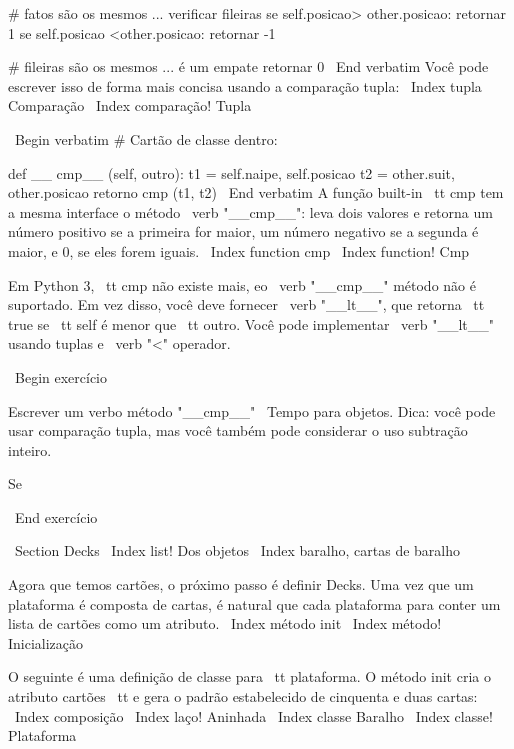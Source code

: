 \documentclass[10pt]{book}
\begin{document}
{{{{{{{{{{{{{{{{        # fatos são os mesmos ... verificar fileiras
        se self.posicao> other.posicao: retornar 1
        se self.posicao <other.posicao: retornar -1

        # fileiras são os mesmos ... é um empate
        retornar 0    
\ End {verbatim}
%
Você pode escrever isso de forma mais concisa usando a comparação tupla:
\ Index {tupla Comparação}
\ Index {comparação! Tupla}

\ Begin {verbatim}
# Cartão de classe dentro:

    def __ cmp__ (self, outro):
        t1 = self.naipe, self.posicao
        t2 = other.suit, other.posicao
        retorno cmp (t1, t2)
\ End {verbatim}
%
A função built-in {\ tt cmp} tem a mesma interface
o método \ verb "__cmp__": leva dois valores e retorna
um número positivo se a primeira for maior, um número negativo
se a segunda é maior, e 0, se eles forem iguais.
\ Index {function cmp}
\ Index {function! Cmp}

Em Python 3, {\ tt cmp} não existe mais, eo \ verb "__cmp__"
método não é suportado. Em vez disso, você deve fornecer \ verb "__lt__",
que retorna {\ tt true} se {\ tt self} é menor que {\ tt outro}.
Você pode implementar \ verb "__lt__" usando tuplas e \ verb "<"
operador.

\ Begin {} exercício

Escrever um verbo método "__cmp__" \ Tempo para objetos. Dica: você
pode usar comparação tupla, mas você também pode considerar o uso
subtração inteiro.


Se%

\ End {} exercício


\ Section {} Decks
\ Index {list! Dos objetos}
\ Index {baralho, cartas de baralho}

Agora que temos cartões, o próximo passo é definir Decks. Uma vez que um
plataforma é composta de cartas, é natural que cada plataforma para conter um
lista de cartões como um atributo.
\ Index {método init}
\ Index {método! Inicialização}

O seguinte é uma definição de classe para {\ tt plataforma}. O
método init cria o atributo {cartões \ tt} e gera
o padrão estabelecido de cinquenta e duas cartas:
\ Index {composição}
\ Index {laço! Aninhada}
\ Index {classe Baralho}
\ Index {classe! Plataforma}

}}}}}}}}}}}}}}}}
\end{document}
